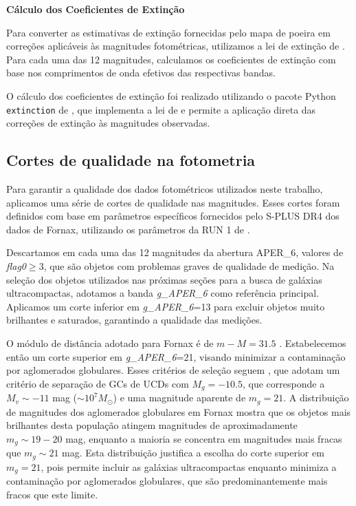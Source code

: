 \textbf{Cálculo dos Coeficientes de Extinção}

Para converter as estimativas de extinção fornecidas pelo mapa de poeira em correções aplicáveis às magnitudes fotométricas, utilizamos a lei de extinção de \cite{cardelli1989dust}. Para cada uma das 12 magnitudes, calculamos os coeficientes de extinção com base nos comprimentos de onda efetivos das respectivas bandas.

\sloppy
O cálculo dos coeficientes de extinção foi realizado utilizando o pacote Python \texttt{extinction} de \cite{barbary2017extinction}, que implementa a lei de \cite{cardelli1989dust} e permite a aplicação direta das correções de extinção às magnitudes observadas.

\subsection{Cortes de qualidade na fotometria}\label{subsec:cuts}
Para garantir a qualidade dos dados fotométricos utilizados neste trabalho, aplicamos uma série de cortes de qualidade nas magnitudes. Esses cortes foram definidos com base em parâmetros específicos fornecidos pelo S-PLUS DR4 dos dados de Fornax, utilizando os parâmetros da RUN 1 de \cite{haack2024splusfornaxprojectsfp}.

Descartamos em cada uma das 12 magnitudes da abertura APER\_6, valores de \textit{flag0}$\geq$3, que são objetos com problemas graves de qualidade de medição. Na seleção dos objetos utilizados nas próximas seções para a busca de galáxias ultracompactas, adotamos a banda \textit{g\_APER\_6} como referência principal. Aplicamos um corte inferior em \textit{g\_APER\_6}=13 para excluir objetos muito brilhantes e saturados, garantindo a qualidade das medições. 

O módulo de distância adotado para Fornax é de $m-M=31.5$ \citep{Blakeslee_2009}. Estabelecemos então um corte superior em \textit{g\_APER\_6}=21, visando minimizar a contaminação por aglomerados globulares. Esses critérios de seleção seguem \cite{Cantiello_2020}, que adotam um critério de separação de GCs de UCDs com $M_g=-10.5$, que corresponde a $M_v\sim -11$ mag ($\sim10^7 M_\odot$) e uma magnitude aparente de $m_g=21$. A distribuição de magnitudes dos aglomerados globulares em Fornax mostra que os objetos mais brilhantes desta população atingem magnitudes de aproximadamente $m_g \sim 19-20$ mag, enquanto a maioria se concentra em magnitudes mais fracas que $m_g \sim 21$ mag. Esta distribuição justifica a escolha do corte superior em $m_g=21$, pois permite incluir as galáxias ultracompactas enquanto minimiza a contaminação por aglomerados globulares, que são predominantemente mais fracos que este limite.

